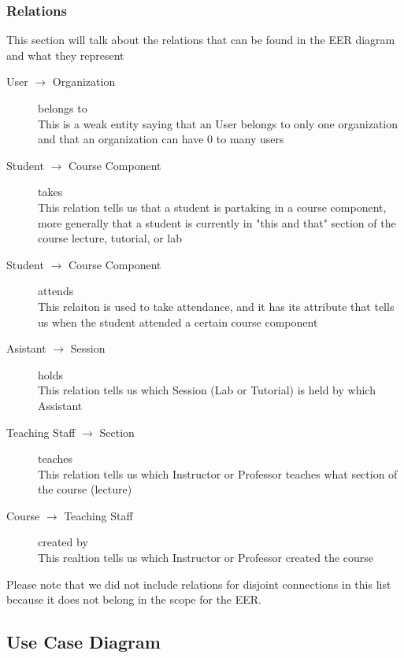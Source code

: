\documentclass[a4paper, 12pt]{article}
\begin{document}
      \newpage
      \subsubsection{Relations}
        \noindent This section will talk about the relations that can be found in the EER diagram and what they represent
        \vspace{1mm}

        \begin{description}
          \item[User $\rightarrow$ Organization] belongs to\\
            This is a weak entity saying that an User belongs to only one organization and that an organization can have 0 to many users
          \item[Student $\rightarrow$ Course Component] takes\\
            This relation tells us that a student is partaking in a course component, more generally that a student is currently in "this and that" section of the course
            lecture, tutorial, or lab
          \item[Student $\rightarrow$ Course Component] attends\\
            This relaiton is used to take attendance, and it has its attribute that tells us when the student attended a certain course component
          \item[Asistant $\rightarrow$ Session] holds\\
            This relation tells us which Session (Lab or Tutorial) is held by which Assistant
          \item[Teaching Staff $\rightarrow$ Section] teaches\\
            This relation tells us which Instructor or Professor teaches what section of the course (lecture)
          \item[Course $\rightarrow$ Teaching Staff] created by\\
            This realtion tells us which Instructor or Professor created the course
        \end{description}

        \begin{tcolorbox}[title=Note]
          Please note that we did not include relations for disjoint connections in this list because it does not belong in the scope for the EER.
        \end{tcolorbox}

        \newpage

    \subsection{Use Case Diagram}
\end{document}
